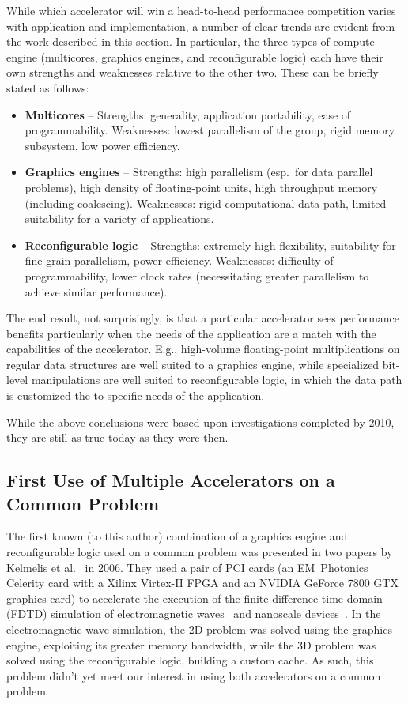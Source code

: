While which accelerator will win a head-to-head performance competition varies
with application and implementation, a number of clear trends are evident
from the work described in this section.  In particular, the three types
of compute engine (multicores, graphics engines, and reconfigurable logic)
each have their own strengths and weaknesses relative to the other two.
These can be briefly stated as follows:
\begin{itemize}
\item {\bf Multicores} -- Strengths: generality, application portability,
ease of programmability. Weaknesses: lowest parallelism of the group,
rigid memory subsystem, low power efficiency.
\item {\bf Graphics engines} -- Strengths: high parallelism (esp.~for data
parallel problems), high density of floating-point units, high throughput
memory (including coalescing). Weaknesses: rigid computational data path,
limited suitability for a variety of applications.
\item {\bf Reconfigurable logic} -- Strengths: extremely high flexibility,
suitability for fine-grain parallelism, power efficiency.  Weaknesses: 
difficulty of programmability, lower clock rates (necessitating greater
parallelism to achieve similar performance).
\end{itemize}

The end result, not surprisingly, is that a particular accelerator sees
performance benefits particularly when the needs of the application
are a match with the capabilities of the accelerator.  E.g., high-volume
floating-point multiplications on regular data structures are well
suited to a graphics engine, while specialized bit-level manipulations
are well suited to reconfigurable logic, in which the data path is
customized the to specific needs of the application.

While the above conclusions were based upon investigations completed
by 2010, they are still as true today as they were then.

\subsection{First Use of Multiple Accelerators on a Common Problem}

The first known (to this author) combination of a graphics engine and
reconfigurable logic used on a common problem was presented
in two papers
by Kelmelis et al.~\cite{khdo06,kdh+06} in 2006.  They used a pair of PCI cards
(an EM~Photonics Celerity card with a Xilinx Virtex-II FPGA and
an NVIDIA GeForce 7800 GTX graphics card) to accelerate the execution of
the finite-difference time-domain (FDTD) simulation of electromagnetic
waves~\cite{khdo06} and nanoscale devices~\cite{kdh+06}.
In the electromagnetic wave simulation, the 2D problem was solved using
the graphics engine, exploiting its greater memory bandwidth, while the 3D
problem was solved using the reconfigurable logic, building a custom cache.
As such, this problem didn't yet meet our interest in using both
accelerators on a common problem.

